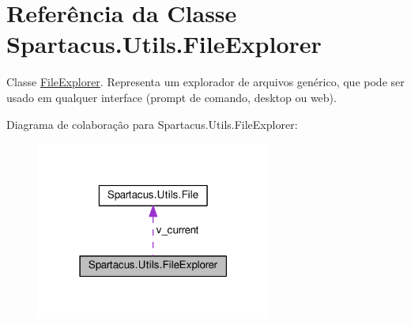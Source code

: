 \hypertarget{classSpartacus_1_1Utils_1_1FileExplorer}{\section{Referência da Classe Spartacus.\+Utils.\+File\+Explorer}
\label{classSpartacus_1_1Utils_1_1FileExplorer}
}


Classe \hyperlink{classSpartacus_1_1Utils_1_1FileExplorer}{File\+Explorer}. Representa um explorador de arquivos genérico, que pode ser usado em qualquer interface (prompt de comando, desktop ou web).  




Diagrama de colaboração para Spartacus.\+Utils.\+File\+Explorer\+:
\nopagebreak
\begin{figure}[H]
\begin{center}
\leavevmode
\includegraphics[width=219pt]{classSpartacus_1_1Utils_1_1FileExplorer__coll__graph}
\end{center}
\end{figure}
